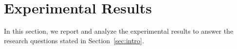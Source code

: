 

\section{Experimental Results}
\vspace{-2pt}

In this section, we report and analyze the experimental results to answer the  research questions stated in Section~\ref{sec:intro}.

